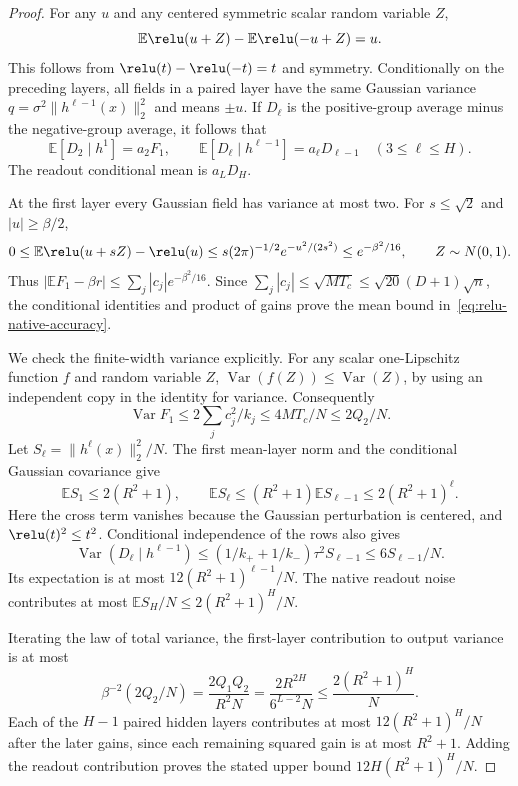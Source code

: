 \begin{proof}
For any $u$ and any centered symmetric scalar random variable $Z$,
\[
 \mathbb E\relu(u+Z)-\mathbb E\relu(-u+Z)=u.
\]
This follows from $\relu(t)-\relu(-t)=t$ and symmetry.
Conditionally on the preceding layers, all fields in a paired layer
have the same Gaussian variance
$q=\sigma^2\|h^{\ell-1}(x)\|_2^2$ and means $\pm u$.
If $D_\ell$ is the positive-group average minus the negative-group
average, it follows that
\[
 \mathbb E[D_2\mid h^1]=a_2F_1,\qquad
 \mathbb E[D_\ell\mid h^{\ell-1}]=a_\ell D_{\ell-1}
                    \quad(3\leq\ell\leq H).
\]
The readout conditional mean is $a_LD_H$.

At the first layer every Gaussian field has variance at most two.
For $s\leq\sqrt2$ and $|u|\geq\beta/2$,
\[
 0\leq\mathbb E\relu(u+sZ)-\relu(u)
      \leq s(2\pi)^{-1/2}e^{-u^2/(2s^2)}
      \leq e^{-\beta^2/16},
 \qquad Z\sim N(0,1).
\]
Thus $|\mathbb E F_1-\beta r|\leq\sum_j|c_j|e^{-\beta^2/16}$.
Since $\sum_j|c_j|\leq\sqrt{MT_c}\leq\sqrt{20}(D+1)\sqrt n$,
the conditional identities and product of gains prove the mean bound
in~\eqref{eq:relu-native-accuracy}.

We check the finite-width variance explicitly.  For any scalar
one-Lipschitz function $f$ and random variable $Z$,
$\operatorname{Var}(f(Z))\leq\operatorname{Var}(Z)$, by using an
independent copy in the identity for variance.
Consequently
\[
 \operatorname{Var}F_1\leq2\sum_jc_j^2/k_j
             \leq4MT_c/N\leq2Q_2/N.
\]
Let $S_\ell=\|h^\ell(x)\|_2^2/N$.
The first mean-layer norm and the conditional Gaussian covariance give
\[
 \mathbb E S_1\leq2(R^2+1),\qquad
 \mathbb E S_\ell\leq(R^2+1)\mathbb E S_{\ell-1}
                 \leq2(R^2+1)^\ell.
\]
Here the cross term vanishes because the Gaussian perturbation is
centered, and $\relu(t)^2\leq t^2$.
Conditional independence of the rows also gives
\[
 \operatorname{Var}(D_\ell\mid h^{\ell-1})
 \leq(1/k_++1/k_-)\tau^2S_{\ell-1}
 \leq6S_{\ell-1}/N.
\]
Its expectation is at most $12(R^2+1)^{\ell-1}/N$.
The native readout noise contributes at most
$\mathbb E S_H/N\leq2(R^2+1)^H/N$.

Iterating the law of total variance, the first-layer contribution to
output variance is at most
\[
 \beta^{-2}(2Q_2/N)
 =\frac{2Q_1Q_2}{R^2N}
 =\frac{2R^{2H}}{6^{L-2}N}
 \leq\frac{2(R^2+1)^H}{N}.
\]
Each of the $H-1$ paired hidden layers contributes at most
$12(R^2+1)^H/N$ after the later gains, since each remaining squared
gain is at most $R^2+1$.  Adding the readout contribution proves the
stated upper bound $12H(R^2+1)^H/N$.
\end{proof}

